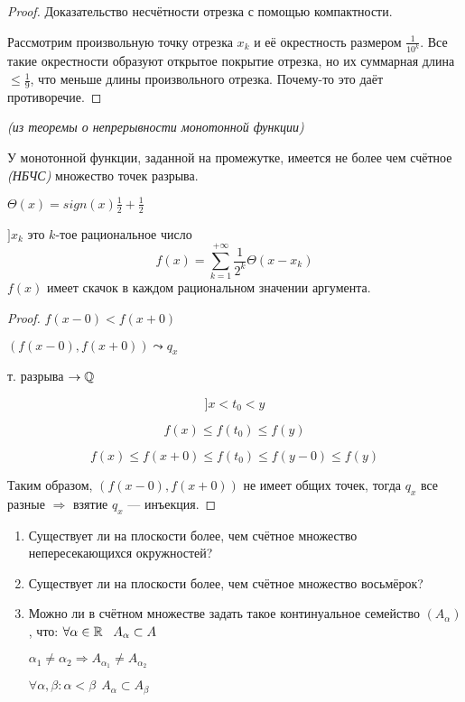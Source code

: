 

\cfoot{}


\begin{proof}
    Доказательство несчётности отрезка с помощью компактности.

    Рассмотрим произвольную точку отрезка $x_k$ и её окрестность размером $\frac{1}{10^k}$. Все такие окрестности образуют открытое покрытие отрезка, но их суммарная длина $\leq\frac{1}{9}$, что меньше длины произвольного отрезка. Почему-то это даёт противоречие.
\end{proof}

\begin{consequence}
    \textit{(из теоремы о непрерывности монотонной функции)}

    У монотонной функции, заданной на промежутке, имеется не более чем счётное \textit{(НБЧС)} множество точек разрыва.
\end{consequence}
\begin{example}
    $\Theta(x) = sign(x) \frac{1}{2} + \frac{1}{2}$

    $] x_k$ это $k$-тое рациональное число
    $$f(x)=\sum\limits_{k=1}^{+\infty} \frac{1}{2^k}\Theta(x-x_k)$$ 
    $f(x)$ имеет скачок в каждом рациональном значении аргумента.
\end{example}
\begin{proof}
    $f(x-0)<f(x+0)$

    $(f(x-0), f(x+0))\leadsto q_x$

    т. разрыва $\to\operatorname*{\mathbb{Q}}$
    
    $$]x<t_0<y$$

    $$f(x)\leq f(t_0)\leq f(y)$$

    $$f(x)\leq f(x+0)\leq f(t_0)\leq f(y-0)\leq f(y)$$

    Таким образом, $(f(x-0), f(x+0))$ не имеет общих точек, тогда $q_x$ все разные $\Rightarrow$ взятие $q_x$ --- инъекция.
\end{proof}
\begin{exercise}
    \begin{enumerate}
        \item Существует ли на плоскости более, чем счётное множество непересекающихся окружностей?
        \item Существует ли на плоскости более, чем счётное множество восьмёрок?
        \item Можно ли в счётном множестве задать такое континуальное семейство $(A_\alpha)$, что:
        $\forall \alpha\in\operatorname*{\mathbb{R}} \ \ A_\alpha\subset A$

        $\alpha_1\not=\alpha_2 \Rightarrow A_{\alpha_1}\not=A_{\alpha_2}$

        $\forall \alpha,\beta: \alpha<\beta \ \ A_\alpha\subset A_\beta$
    \end{enumerate}
\end{exercise}
